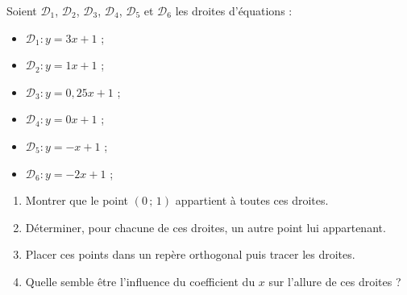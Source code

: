 \begin{act}
Soient $\mathcal{D}_1$, $\mathcal{D}_2$, $\mathcal{D}_3$, $\mathcal{D}_4$, $\mathcal{D}_5$ et $\mathcal{D}_6$ les droites d'équations :
\vspace{-1em}\begin{multicols}{3}\begin{itemize}
	\item $\mathcal{D}_1 : y=3x+1$ ;
	\item $\mathcal{D}_2 : y=1x+1$ ;
	\item $\mathcal{D}_3 : y=0,25x+1$ ;
		\item $\mathcal{D}_4 : y=0x+1$ ;
			\item $\mathcal{D}_5 : y=-x+1$ ;
				\item $\mathcal{D}_6 : y=-2x+1$ ;
\end{itemize}\end{multicols}\vspace{-1em}
\begin{enumerate}
	\item Montrer que le point $(0\,;\,1)$ appartient à toutes ces droites.
	\item Déterminer, pour chacune de ces droites, un autre point lui appartenant.
	\item Placer ces points dans un repère orthogonal puis tracer les droites.
	\item Quelle semble être l'influence du coefficient du $x$ sur \og l'allure \fg{} de ces droites ?
\end{enumerate}
\end{act}


\sautpage

